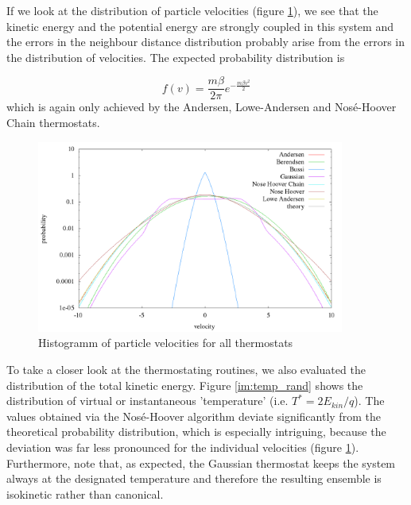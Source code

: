 If we look at the distribution of particle velocities (figure \ref{im:vel_rand}), we see that the kinetic energy and the potential energy are strongly coupled in this system and the errors in the neighbour distance distribution probably arise from the errors in the distribution of velocities. The expected probability distribution is

\begin{equation}
f(v) = \frac{m\beta}{2\pi}e^{-\frac{m\beta v^2}{2}}
\end{equation} 
which is again only achieved by the Andersen, Lowe-Andersen and Nosé-Hoover Chain thermostats. 

\begin{figure}[H]
\centering
\includegraphics[width=0.9\textwidth]{./graphics/Histogramm_velocity_rand_T=20_p=64.png}
\caption{Histogramm of particle velocities for all thermostats}
\label{im:vel_rand}
\end{figure}

To take a closer look at the thermostating routines, we also evaluated the distribution of the total kinetic energy. Figure \ref{im:temp_rand} shows the distribution of virtual or instantaneous 'temperature' (i.e. $T^* = 2E_{kin}/q$). The values obtained via the Nosé-Hoover algorithm deviate significantly from the theoretical probability distribution, which is especially intriguing, because the deviation was far less pronounced for the individual velocities (figure \ref{im:vel_rand}). Furthermore, note that, as expected, the Gaussian thermostat keeps the system always at the designated temperature and therefore the resulting ensemble is isokinetic rather than canonical.  


